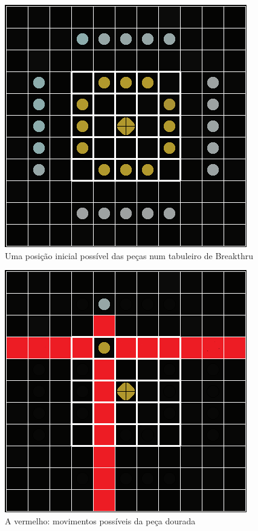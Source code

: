 \documentclass[a4paper]{article}
\begin{document}
\begin{figure}
\centering
\includegraphics[scale=1]{Breakthru_board.png}
\centering
\caption{Uma posição inicial possível das peças num tabuleiro de Breakthru}
\label{fig:init}
\end{figure}
\begin{figure}
\centering
\includegraphics[scale=1]{Breakthru_moves.png}
\caption{A vermelho: movimentos possíveis da peça dourada}
\label{fig:captures}
\end{figure}
\end{document}
